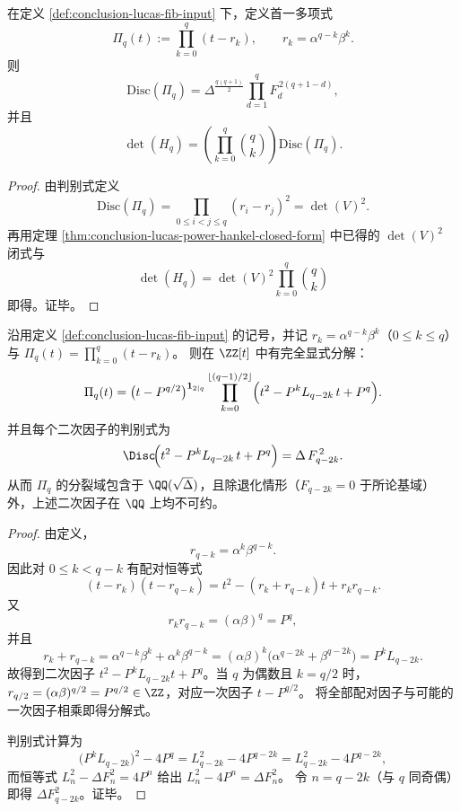 \begin{theorem}[对称幂特征多项式判别式分解]\label{thm:conclusion-sympower-discriminant-factorization}
在定义 \ref{def:conclusion-lucas-fib-input} 下，定义首一多项式
\[
\Pi_q(t):=\prod_{k=0}^{q}(t-r_k),
\qquad r_k=\alpha^{q-k}\beta^k.
\]
则
\[
\mathrm{Disc}(\Pi_q)
=
\Delta^{\frac{q(q+1)}{2}}
\prod_{d=1}^{q}F_d^{\,2(q+1-d)},
\]
并且
\[
\det(H_q)
=
\left(\prod_{k=0}^{q}\binom{q}{k}\right)\mathrm{Disc}(\Pi_q).
\]
\end{theorem}
\begin{proof}
由判别式定义
\[
\mathrm{Disc}(\Pi_q)
=\prod_{0\le i<j\le q}(r_i-r_j)^2
=\det(V)^2.
\]
再用定理 \ref{thm:conclusion-lucas-power-hankel-closed-form} 中已得的 \(\det(V)^2\) 闭式与
\[
\det(H_q)=\det(V)^2\prod_{k=0}^{q}\binom{q}{k}
\]
即得。证毕。
\end{proof}

\begin{proposition}\label{prop:conclusion-lucas-quadratic-factorization}
沿用定义 \ref{def:conclusion-lucas-fib-input} 的记号，并记
\(
r_k=\alpha^{q-k}\beta^k
\)（\(0\le k\le q\)）与
\(
\Pi_q(t)=\prod_{k=0}^{q}(t-r_k)
\)。
则在 \(\ZZ[t]\) 中有完全显式分解：
\[
\Pi_q(t)
=\bigl(t-P^{q/2}\bigr)^{\mathbf 1_{2\mid q}}
\prod_{k=0}^{\lfloor (q-1)/2\rfloor}
\Bigl(t^2-P^{k}L_{q-2k}\,t+P^{q}\Bigr).
\]
并且每个二次因子的判别式为
\[
\Disc\!\Bigl(t^2-P^{k}L_{q-2k}\,t+P^{q}\Bigr)
=\Delta\,F_{q-2k}^{\,2}.
\]
从而 \(\Pi_q\) 的分裂域包含于 \(\QQ(\sqrt{\Delta})\)，且除退化情形（\(F_{q-2k}=0\) 于所论基域）外，上述二次因子在 \(\QQ\) 上均不可约。
\end{proposition}
\begin{proof}
由定义，
\[
r_{q-k}=\alpha^{k}\beta^{q-k}.
\]
因此对 \(0\le k<q-k\) 有配对恒等式
\[
(t-r_k)(t-r_{q-k})
=t^2-(r_k+r_{q-k})t+r_kr_{q-k}.
\]
又
\[
r_kr_{q-k}=(\alpha\beta)^q=P^{q},
\]
并且
\[
r_k+r_{q-k}
=\alpha^{q-k}\beta^{k}+\alpha^{k}\beta^{q-k}
=(\alpha\beta)^{k}\bigl(\alpha^{q-2k}+\beta^{q-2k}\bigr)
=P^{k}L_{q-2k}.
\]
故得到二次因子 \(t^2-P^{k}L_{q-2k}t+P^{q}\)。当 \(q\) 为偶数且 \(k=q/2\) 时，
\(
r_{q/2}=(\alpha\beta)^{q/2}=P^{q/2}\in\ZZ
\)，对应一次因子 \(t-P^{q/2}\)。
将全部配对因子与可能的一次因子相乘即得分解式。
\par
判别式计算为
\[
\bigl(P^{k}L_{q-2k}\bigr)^2-4P^{q}
=L_{q-2k}^2-4P^{q-2k}
=L_{q-2k}^2-4P^{q-2k},
\]
而恒等式
\(
L_n^2-\Delta F_n^2=4P^{n}
\)
给出
\(
L_n^2-4P^n=\Delta F_n^2
\)。
令 \(n=q-2k\)（与 \(q\) 同奇偶）即得 \(\Delta F_{q-2k}^2\)。证毕。
\end{proof}

